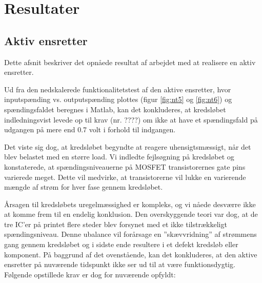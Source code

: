 

\clearpage
\chapter{Resultater}
\label{sec:resultater}

\section{Aktiv ensretter}
\label{sec:aktiv-ensretter}

Dette afsnit beskriver det opnåede resultat af arbejdet med at realisere en aktiv ensretter. 

Ud fra den nedskalerede funktionalitetstest af den aktive ensretter, hvor inputspænding vs. outputspænding plottes (figur \ref{fig:nt5} og \ref{fig:nt6}) og spændingsfaldet beregnes i Matlab, kan det konkluderes, at kredsløbet indledningsvist levede op til krav (nr. ????) om ikke at have et spændingsfald på udgangen på mere end 0.7 volt i forhold til indgangen.  

Det viste sig dog, at kredsløbet begyndte at reagere uhensigtsmæssigt, når det blev belastet med en større load. Vi indledte fejlsøgning på kredsløbet og konstaterede, at spændingsniveauerne på MOSFET transistorernes gate pins varierede meget. Dette vil medvirke, at transistorerne vil lukke en varierende mængde af strøm for hver fase gennem kredsløbet. 

Årsagen til kredsløbets uregelmæssighed er kompleks, og vi nåede desværre ikke at komme frem til en endelig konklusion. Den overskyggende teori var dog, at de tre IC’er på printet flere steder blev forsynet med et ikke tilstrækkeligt spændingsniveau. Denne ubalance vil forårsage en ”skævvridning” af strømmens gang gennem kredsløbet og i sidste ende resultere i et defekt kredsløb eller komponent.  
På baggrund af det ovenstående, kan det konkluderes, at den aktive ensretter på nuværende tidspunkt ikke ser ud til at være funktionsdygtig. Følgende opstillede krav er dog for nuværende opfyldt:

